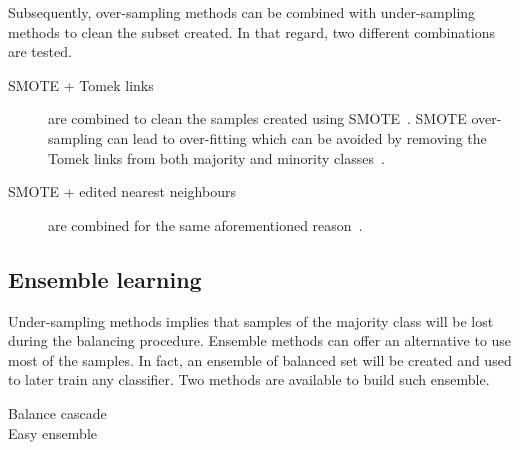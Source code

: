 \documentclass[twoside,11pt]{article}
\begin{document}
Subsequently, over-sampling methods can be combined with under-sampling methods to clean the subset created.
In that regard, two different combinations are tested.

\begin{description}
  \item[SMOTE + Tomek links] are combined to clean the samples created using SMOTE~\cite{batista2003balancing}.
SMOTE over-sampling can lead to over-fitting which can be avoided by removing the Tomek links from both majority and minority classes~\cite{prati2009data}.
  \item[SMOTE + edited nearest neighbours] are combined for the same aforementioned reason~\cite{batista2004study}.
\end{description}

\subsection{Ensemble learning}

Under-sampling methods implies that samples of the majority class will be lost during the balancing procedure.
Ensemble methods can offer an alternative to use most of the samples.
In fact, an ensemble of balanced set will be created and used to later train any classifier.
Two methods are available to build such ensemble.

\begin{description}
  \item[Balance cascade]
  \item[Easy ensemble]
\end{description}
\end{document}
